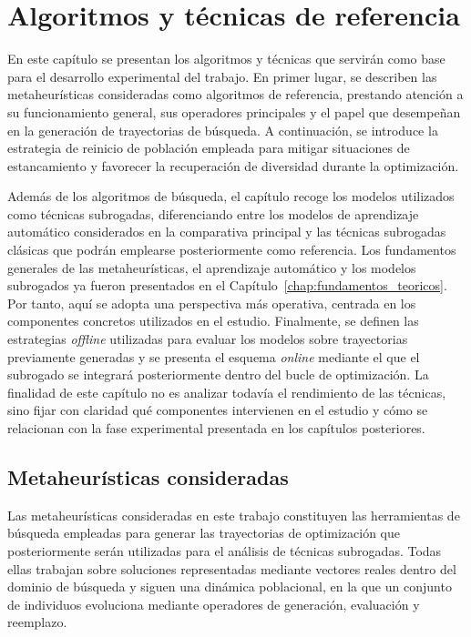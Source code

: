 \chapter{Algoritmos y técnicas de referencia}
\label{chap:algo_tecnicas_ref}


En este capítulo se presentan los algoritmos y técnicas que servirán como base para el desarrollo experimental del trabajo. En primer lugar, se describen las metaheurísticas consideradas como algoritmos de referencia, prestando atención a su funcionamiento general, sus operadores principales y el papel que desempeñan en la generación de trayectorias de búsqueda. A continuación, se introduce la estrategia de reinicio de población empleada para mitigar situaciones de estancamiento y favorecer la recuperación de diversidad durante la optimización.

Además de los algoritmos de búsqueda, el capítulo recoge los modelos utilizados como técnicas subrogadas, diferenciando entre los modelos de aprendizaje automático considerados en la comparativa principal y las técnicas subrogadas clásicas que podrán emplearse posteriormente como referencia. Los fundamentos generales de las metaheurísticas, el aprendizaje automático y los modelos subrogados ya fueron presentados en el Capítulo~\ref{chap:fundamentos_teoricos}. Por tanto, aquí se adopta una perspectiva más operativa, centrada en los componentes concretos utilizados en el estudio. Finalmente, se definen las estrategias \textit{offline} utilizadas para evaluar los modelos sobre trayectorias previamente generadas y se presenta el esquema \textit{online} mediante el que el subrogado se integrará posteriormente dentro del bucle de optimización. La finalidad de este capítulo no es analizar todavía el rendimiento de las técnicas, sino fijar con claridad qué componentes intervienen en el estudio y cómo se relacionan con la fase experimental presentada en los capítulos posteriores.


\section{Metaheurísticas consideradas}

Las metaheurísticas consideradas en este trabajo constituyen las herramientas de búsqueda empleadas para generar las trayectorias de optimización que posteriormente serán utilizadas para el análisis de técnicas subrogadas. Todas ellas trabajan sobre soluciones representadas mediante vectores reales dentro del dominio de búsqueda y siguen una dinámica poblacional, en la que un conjunto de individuos evoluciona mediante operadores de generación, evaluación y reemplazo.


